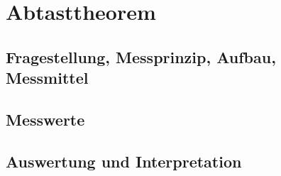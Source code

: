 %
%
\chapter{Abtasttheorem}
\label{chap:VERSUCH_5}
 
\section{Fragestellung, Messprinzip, Aufbau, Messmittel}
\label{chap:VERSUCH_5_FRAGESTELLUNG}
\section{Messwerte}
\label{chap:VERSUCH_5_MESSWERTE}

\section{Auswertung und Interpretation}
\label{chap:VERSUCH_5_AUSWERTUNG}
